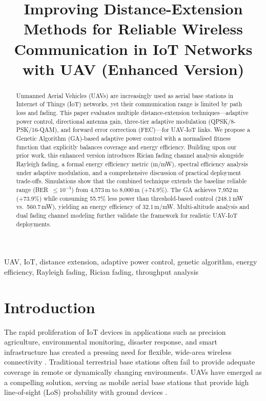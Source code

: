 \documentclass[conference]{IEEEtran}
\title{Improving Distance-Extension Methods for Reliable Wireless Communication in IoT Networks with UAV (Enhanced Version)}
\author{
\IEEEauthorblockN{AVASU PALVASH KUMAR, MOOD NARENDAR}
\IEEEauthorblockA{
Department of Computer Science and Engineering\\
Indian Institute of Information Technology, Sri City, Chittoor\\
Andhra Pradesh, India\\
palvashkumar.a23@iiits.in, mood.n23@iiits.in}
}
\begin{document}
\maketitle

\begin{abstract}
Unmanned Aerial Vehicles (UAVs) are increasingly used as aerial base stations in Internet of Things (IoT) networks, yet their communication range is limited by path loss and fading. This paper evaluates multiple distance-extension techniques---adaptive power control, directional antenna gain, three-tier adaptive modulation (QPSK/8-PSK/16-QAM), and forward error correction (FEC)---for UAV-IoT links. We propose a Genetic Algorithm (GA)-based adaptive power control with a normalised fitness function that explicitly balances coverage and energy efficiency. Building upon our prior work, this enhanced version introduces Rician fading channel analysis alongside Rayleigh fading, a formal energy efficiency metric (m/mW), spectral efficiency analysis under adaptive modulation, and a comprehensive discussion of practical deployment trade-offs. Simulations show that the combined technique extends the baseline reliable range (BER~$\leq 10^{-3}$) from 4,573\,m to 8,000\,m (+74.9\%). The GA achieves 7,952\,m (+73.9\%) while consuming 55.7\% less power than threshold-based control (248.1\,mW vs.\ 560.7\,mW), yielding an energy efficiency of 32.1\,m/mW. Multi-altitude analysis and dual fading channel modeling further validate the framework for realistic UAV-IoT deployments.
\end{abstract}

\begin{IEEEkeywords}
UAV, IoT, distance extension, adaptive power control, genetic algorithm, energy efficiency, Rayleigh fading, Rician fading, throughput analysis
\end{IEEEkeywords}

\section{Introduction}

The rapid proliferation of IoT devices in applications such as precision agriculture, environmental monitoring, disaster response, and smart infrastructure has created a pressing need for flexible, wide-area wireless connectivity \cite{b1}. Traditional terrestrial base stations often fail to provide adequate coverage in remote or dynamically changing environments. UAVs have emerged as a compelling solution, serving as mobile aerial base stations that provide high line-of-sight (LoS) probability with ground devices \cite{b2,b3}.
\end{document}
